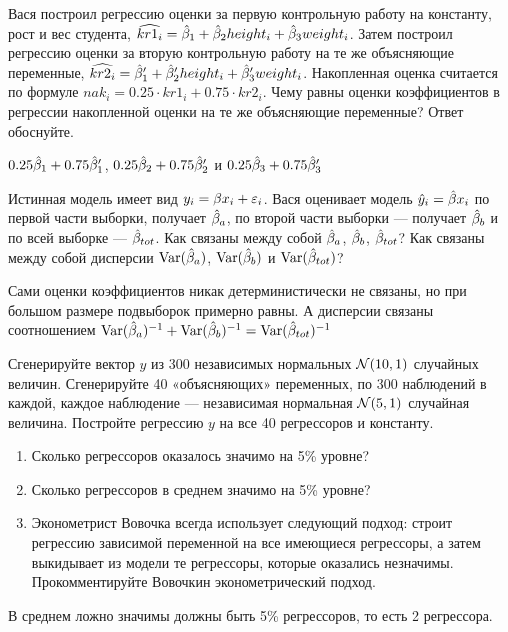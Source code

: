 \begin{problem}
Вася построил регрессию оценки за первую контрольную работу на константу, рост и вес студента, $\widehat{kr1_i}=\hat{\beta}_1 + \hat{\beta}_2 height_i + \hat{\beta}_3 weight_i$. Затем построил регрессию оценки за вторую контрольную работу на те же объясняющие переменные, $\widehat{kr2_i}=\hat{\beta}_1' + \hat{\beta}_2' height_i + \hat{\beta}_3' weight_i$. Накопленная оценка считается по формуле $nak_i=0.25 \cdot kr1_i + 0.75 \cdot kr2_i$. Чему равны оценки коэффициентов в регрессии накопленной оценки на те же объясняющие переменные? Ответ обоснуйте.

\begin{sol}
$0.25\hat{\beta}_1+0.75\hat{\beta}_1'$, $0.25\hat{\beta}_2+0.75\hat{\beta}_2'$ и $0.25\hat{\beta}_3+0.75\hat{\beta}_3'$
\end{sol}
\end{problem}


\begin{problem}
Истинная модель имеет вид $y_i=\beta x_i +\varepsilon_i$. Вася оценивает модель $\hat{y}_i=\hat{\beta} x_i$ по первой части выборки, получает $\hat{\beta}_a$, по второй части выборки — получает $\hat{\beta}_b$ и по всей выборке — $\hat{\beta}_{tot}$. Как связаны между собой $\hat{\beta}_{a}$, $\hat{\beta}_{b}$, $\hat{\beta}_{tot}$? Как связаны между собой дисперсии $\operatorname{Var}(\hat{\beta}_a)$,  $\operatorname{Var}(\hat{\beta}_b)$ и  $\operatorname{Var}(\hat{\beta}_{tot})$?


\begin{sol}
Сами оценки коэффициентов никак детерминистически не связаны, но при большом размере подвыборок примерно равны. А дисперсии связаны соотношением $\operatorname{Var}(\hat{\beta}_a)^{-1}+\operatorname{Var}(\hat{\beta}_b)^{-1}=\operatorname{Var}(\hat{\beta}_{tot})^{-1}$
\end{sol}
\end{problem}


\begin{problem}
Сгенерируйте вектор $y$ из 300 независимых нормальных $\mathcal{N}(10,1)$ случайных величин.
Сгенерируйте 40 «объясняющих» переменных, по 300 наблюдений в каждой, каждое наблюдение — независимая нормальная $\mathcal{N}(5,1)$ случайная величина. Постройте регрессию $y$ на все 40 регрессоров и константу.
\begin{enumerate}
\item Сколько регрессоров оказалось значимо на 5\% уровне?
\item Сколько регрессоров в среднем значимо на 5\% уровне?
\item Эконометрист Вовочка всегда использует следующий подход: строит регрессию зависимой переменной на все имеющиеся регрессоры, а затем выкидывает из модели те регрессоры, которые оказались незначимы. Прокомментируйте Вовочкин эконометрический подход.
\end{enumerate}


\begin{sol}
В среднем ложно значимы должны быть 5\% регрессоров, то есть 2 регрессора.
\end{sol}
\end{problem}



